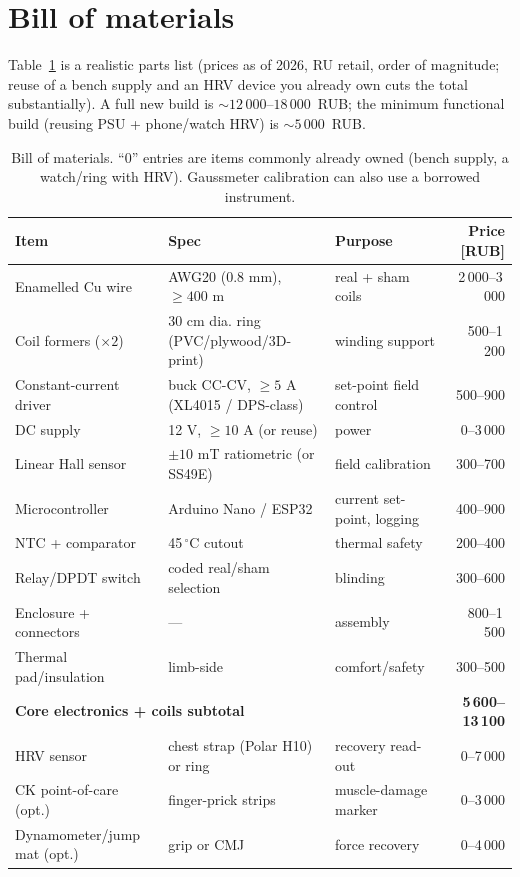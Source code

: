 \documentclass[11pt,a4paper]{article}
\begin{document}
\section{Bill of materials}
Table~\ref{tab:bom} is a realistic parts list (prices as of 2026, RU
retail, order of magnitude; reuse of a bench supply and an HRV device you
already own cuts the total substantially). A full new build is
$\sim\!12\,000$--$18\,000$~RUB; the minimum functional build
(reusing PSU + phone/watch HRV) is $\sim\!5\,000$~RUB.

\begin{table}[h]
\centering\small
\begin{tabular}{lllr}
\toprule
Item & Spec & Purpose & Price [RUB]\\
\midrule
Enamelled Cu wire & AWG20 (0.8 mm), $\ge400$ m & real + sham coils & 2\,000--3\,000\\
Coil formers ($\times2$) & 30 cm dia. ring (PVC/plywood/3D-print) & winding support & 500--1\,200\\
Constant-current driver & buck CC-CV, $\ge5$ A (XL4015 / DPS-class) & set-point field control & 500--900\\
DC supply & 12 V, $\ge10$ A (or reuse) & power & 0--3\,000\\
Linear Hall sensor & $\pm10$ mT ratiometric (or SS49E) & field calibration & 300--700\\
Microcontroller & Arduino Nano / ESP32 & current set-point, logging & 400--900\\
NTC + comparator & 45\,$^\circ$C cutout & thermal safety & 200--400\\
Relay/DPDT switch & coded real/sham selection & blinding & 300--600\\
Enclosure + connectors & --- & assembly & 800--1\,500\\
Thermal pad/insulation & limb-side & comfort/safety & 300--500\\
\midrule
\multicolumn{3}{l}{\textbf{Core electronics + coils subtotal}} & \textbf{5\,600--13\,100}\\
\addlinespace
HRV sensor & chest strap (Polar H10) or ring & recovery read-out & 0--7\,000\\
CK point-of-care (opt.) & finger-prick strips & muscle-damage marker & 0--3\,000\\
Dynamometer/jump mat (opt.) & grip or CMJ & force recovery & 0--4\,000\\
\bottomrule
\end{tabular}
\caption{Bill of materials. ``0'' entries are items commonly already owned
(bench supply, a watch/ring with HRV). Gaussmeter calibration can also use
a borrowed instrument.}
\label{tab:bom}
\end{table}
\end{document}
